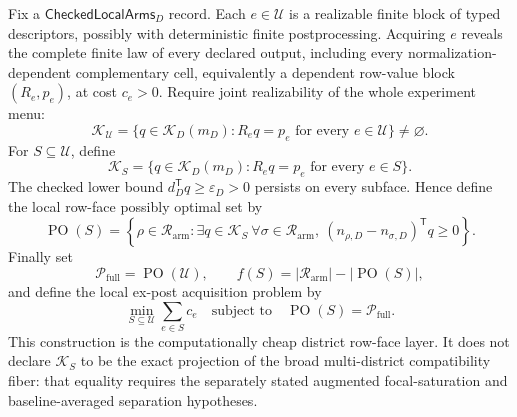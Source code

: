 Fix a \(\mathsf{CheckedLocalArms}_D\) record.  Each \(e\in\mathcal U\) is a realizable finite block of typed descriptors, possibly with deterministic finite postprocessing.  Acquiring \(e\) reveals the complete finite law of every declared output, including every normalization-dependent complementary cell, equivalently a dependent row-value block \((R_e,p_e)\), at cost \(c_e>0\).  Require joint realizability of the whole experiment menu:
\[
\mathcal K_{\mathcal U}
=\{q\in\mathcal K_D(m_D):R_eq=p_e\text{ for every }e\in\mathcal U\}
\ne\varnothing.
\]
For \(S\subseteq\mathcal U\), define
\[
\mathcal K_S
=\{q\in\mathcal K_D(m_D):R_eq=p_e\text{ for every }e\in S\}.
\]
The checked lower bound \(d_D^{\mathsf T}q\geq\varepsilon_D>0\) persists on every subface.  Hence define the local row-face possibly optimal set by
\[
\operatorname{PO}(S)
=\left\{\rho\in\mathcal R_{\mathrm{arm}}:
\exists q\in\mathcal K_S\ \forall\sigma\in\mathcal R_{\mathrm{arm}},\ 
(n_{\rho,D}-n_{\sigma,D})^{\mathsf T}q\geq0\right\}.
\]
Finally set
\[
\mathcal P_{\mathrm{full}}=\operatorname{PO}(\mathcal U),
\qquad
f(S)=|\mathcal R_{\mathrm{arm}}|-|\operatorname{PO}(S)|,
\]
and define the local ex-post acquisition problem by
\[
\min_{S\subseteq\mathcal U}\sum_{e\in S}c_e
\quad\text{subject to}\quad
\operatorname{PO}(S)=\mathcal P_{\mathrm{full}}.
\]
This construction is the computationally cheap district row-face layer.  It does not declare \(\mathcal K_S\) to be the exact projection of the broad multi-district compatibility fiber: that equality requires the separately stated augmented focal-saturation and baseline-averaged separation hypotheses.